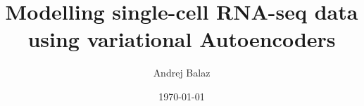 \documentclass[10pt,a4paper]{report}
\begin{document}
\title{Modelling single-cell RNA-seq data using variational Autoencoders}
\author{Andrej Balaz}
\date{\today}
\maketitle


\tableofcontents
\newpage








 
\end{document}
